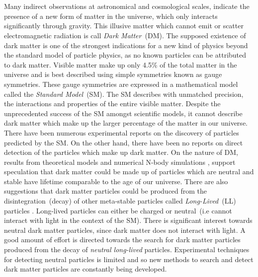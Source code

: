 \paragraph*{} \mbox{}\\
Many indirect observations at astronomical and cosmological scales\cite{DM}, indicate the presence of a new form of matter in the universe, which
only interacts significantly through gravity. This illusive matter which cannot emit or scatter electromagnetic radiation is call \textit{Dark Matter}~(DM).
The supposed existence of dark matter is one of the strongest indications for a new kind of physics beyond the standard model of particle physics, as no known particles can be attributed to dark matter. Visible matter make up only 4.5\% of the total matter in the universe and is best described using simple symmetries known as gauge symmetries. These gauge symmetries are expressed in a mathematical model called the \textit{Standard Model}~(SM). The SM describes with unmatched precision, the interactions and properties of the entire visible matter.  Despite the unprecedented success of the SM amongst scientific models, it cannot describe dark matter which make up the larger percentage of the matter in our universe. There have been numerous experimental reports on the discovery of particles predicted by the SM. On the other hand, there have been no reports on direct detection of the particles which make up dark matter. On the nature of DM, results from theoretical models and numerical N-body simulations \cite{DMS}, support speculation that dark matter could be made up of particles which are neutral and stable \ie have lifetime comparable to the age of our universe. There are also suggestions that dark matter particles could be produced from the disintegration~(decay) of other meta-stable particles called \textit{Long-Lived}~(LL) particles \cite{SUSYDM}. Long-lived particles can either be charged or neutral~(i.e cannot interact with light in the context of the SM). There is significant interest towards neutral dark matter particles,  since dark matter does not interact with light. A good amount of effort is directed towards the search for dark matter particles produced from the decay of \textit{neutral long-lived} particles\cite{LSPDM}. Experimental techniques for detecting neutral particles is limited and so new methods to search and detect dark matter particles are constantly being developed.  %
